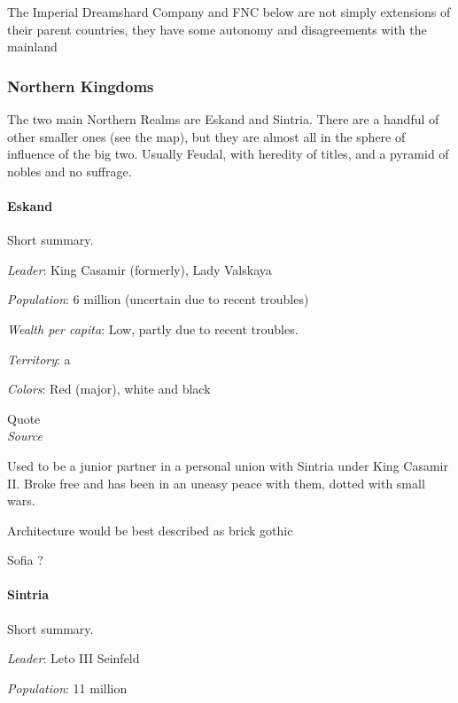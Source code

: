The Imperial Dreamshard Company and FNC below are not simply extensions of their parent countries, they have some autonomy and disagreements with the mainland



\subsubsection{Northern Kingdoms}

The two main Northern Realms are Eskand and Sintria. There are a handful of other smaller ones (see the map), but they are almost all in the sphere of influence of the big two. Usually Feudal, with heredity of titles, and a pyramid of nobles and no suffrage.

\paragraph{Eskand}


Short summary.


\textit{Leader}: King Casamir (formerly), Lady Valskaya

\textit{Population}: 6 million (uncertain due to recent troubles)

\textit{Wealth per capita}: Low, partly due to recent troubles.

\textit{Territory}: a
    
\textit{Colors}: Red (major), white and black


\begin{rpg-quotebox}
Quote \\ \textendash \textit{Source}
\end{rpg-quotebox}



Used to be a junior partner in a personal union with Sintria under King Casamir II.
Broke free and has been in an uneasy peace with them, dotted with small wars.
    

Architecture would be best described as brick gothic



Sofia ?



\paragraph{Sintria}

Short summary.

\textit{Leader}: Leto III Seinfeld

\textit{Population}: 11 million

